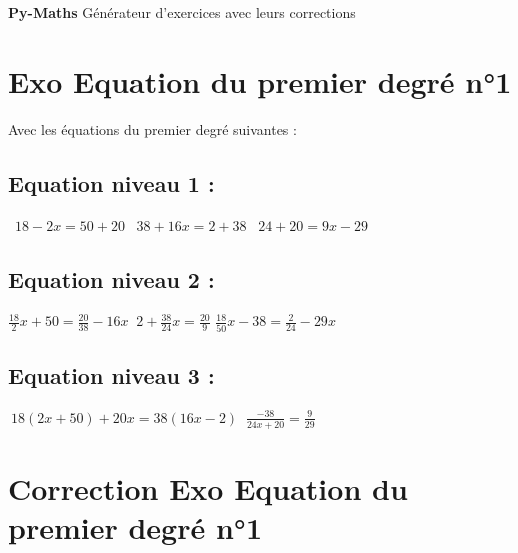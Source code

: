 \documentclass{article}%
\begin{document}
%
\normalsize%
\pagestyle{header}%
\begin{minipage}{\textwidth}%
\centering%
\vspace*{200pt}%
\fontsize{50}{36}%
\selectfont%
\textbf{Py{-}Maths}%
\linebreak%
\fontsize{30}{24}%
\selectfont%
Générateur d'exercices avec leurs corrections%
\end{minipage}%
\newpage%
\fontsize{12}{10}%
\selectfont%
\section*{Exo Equation du premier degré n°1}%
\label{sec:ExoEquationdupremierdegrn1}%
Avec les équations du premier degré suivantes : %
\subsection*{Equation niveau 1 : }%
\label{subsec:Equationniveau1}%
\ $18 - 2x = 50 + 20 $%
\vspace{5mm}%
\newline%
\ $38 + 16x  = 2 + 38$%
\vspace{5mm}%
\newline%
\ $24 + 20 = 9x - 29$

%
\subsection*{Equation niveau 2 : }%
\label{subsec:Equationniveau2}%
$\frac{18}{2}x + 50 = \frac{20}{38} - 16x$%
\vspace{5mm}%
\newline%
$\ 2 + \frac{38}{24}x = \frac{20}{9}$%
\vspace{5mm}%
\newline%
$\frac{18}{50}x - 38 = \frac{2}{24} - 29x$%
\vspace{5mm}%
\newline

%
\subsection*{Equation niveau 3 : }%
\label{subsec:Equationniveau3}%
$\ 18(2x + 50) + 20x = 38(16x - 2)$%
\vspace{5mm}%
\newline%
$\ \frac{-38}{24x + 20} = \frac{9}{29}$%
\vspace{5mm}%
\newline

%
\newpage%
\section*{Correction Exo Equation du premier degré n°1}%
\label{sec:CorrectionExoEquationdupremierdegrn1}%
\end{document}
